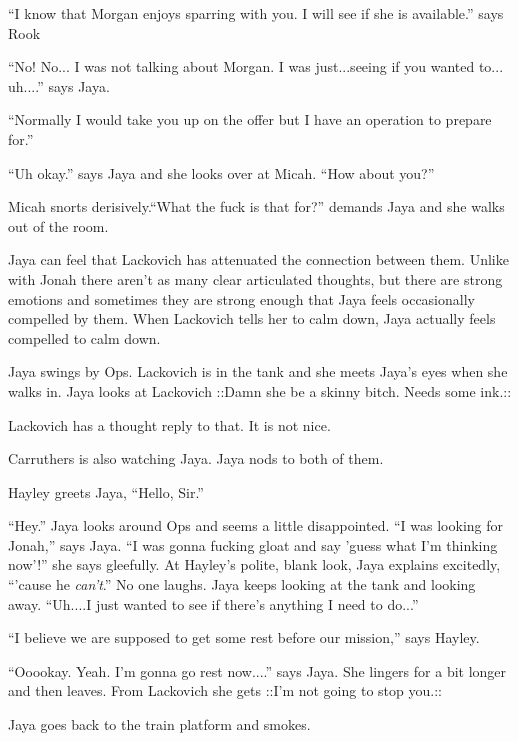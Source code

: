 ``I know that Morgan enjoys sparring with you.  I will see if she is available.'' says Rook

``No!  No... I was not talking about Morgan.  I was just...seeing if you wanted to... uh....'' says Jaya.

``Normally I would take you up on the offer but I have an operation to prepare for.''

``Uh okay.'' says Jaya and she looks over at Micah.  ``How about you?''

Micah snorts derisively.``What the fuck is that for?'' demands Jaya and she walks out of the room.



Jaya can feel that Lackovich has attenuated the connection between them.  Unlike with Jonah there aren't as many clear articulated thoughts, but there are strong emotions and sometimes they are strong enough that Jaya feels occasionally compelled by them.  When Lackovich tells her to calm down, Jaya actually feels compelled to calm down.





Jaya swings by Ops.  Lackovich is in the tank and she meets Jaya's eyes when she walks in.  Jaya looks at Lackovich  {\color[RGB]{255,0,0}::Damn she be a skinny bitch.  Needs some ink.::} 

Lackovich has a thought reply to that.  It is not nice.

Carruthers is also watching Jaya.  Jaya nods to both of them.

Hayley greets Jaya, ``Hello, Sir.''

``Hey.''  Jaya looks around Ops and seems a little disappointed.  ``I was looking for Jonah,'' says Jaya.  ``I was gonna fucking gloat and say 'guess what I'm thinking now'!'' she says gleefully.  At Hayley's polite, blank look, Jaya explains excitedly, ``'cause he \textit{can't}.''  No one laughs.  Jaya keeps looking at the tank and looking away.  ``Uh....I just wanted to see if there's anything I need to do...''

``I believe we are supposed to get some rest before our mission,'' says Hayley.

``Ooookay.  Yeah.  I'm gonna go rest now....'' says Jaya.  She lingers for a bit longer and then leaves.   From Lackovich she gets  {\color[RGB]{74,134,232}::I'm not going to stop you.::} 



Jaya goes back to the train platform and smokes.



